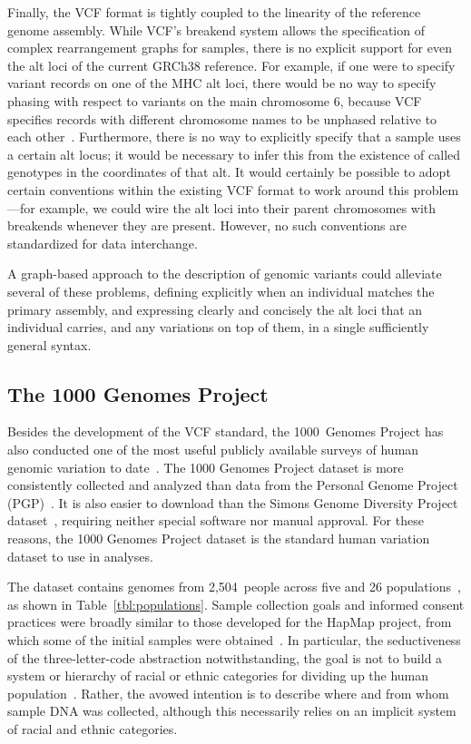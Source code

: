 Finally, the VCF format is tightly coupled to the linearity of the reference genome assembly. While VCF's breakend system allows the specification of complex rearrangement graphs for samples, there is no explicit support for even the alt loci of the current GRCh38 reference. For example, if one were to specify variant records on one of the MHC alt loci, there would be no way to specify phasing with respect to variants on the main chromosome 6, because VCF specifies records with different chromosome names to be unphased relative to each other~\cite{marshall2013variant}. Furthermore, there is no way to explicitly specify that a sample uses a certain alt locus; it would be necessary to infer this from the existence of called genotypes in the coordinates of that alt. It would certainly be possible to adopt certain conventions within the existing VCF format to work around this problem---for example, we could wire the alt loci into their parent chromosomes with breakends whenever they are present. However, no such conventions are standardized for data interchange.

A graph-based approach to the description of genomic variants could alleviate several of these problems, defining explicitly when an individual matches the primary assembly, and expressing clearly and concisely the alt loci that an individual carries, and any variations on top of them, in a single sufficiently general syntax.

\subsection{The 1000 Genomes Project}

Besides the development of the VCF standard, the 1000~Genomes Project has also conducted one of the most useful publicly available surveys of human genomic variation to date~\cite{10002015global}. The 1000 Genomes Project dataset is more consistently collected and analyzed than data from the Personal Genome Project (PGP)~\cite{church2005personal}. It is also easier to download than the Simons Genome Diversity Project dataset~\cite{simons2017simons}, requiring neither special software nor manual approval. For these reasons, the 1000 Genomes Project dataset is the standard human variation dataset to use in analyses.

The dataset contains genomes from 2,504~people across five  and 26 populations~\cite{10002015global}, as shown in Table~\ref{tbl:populations}. Sample collection goals and informed consent practices were broadly similar to those developed for the HapMap project, from which some of the initial samples were obtained~\cite{international2004integrating}. In particular, the seductiveness of the three-letter-code abstraction notwithstanding, the goal is not to build a system or hierarchy of racial or ethnic categories for dividing up the human population~\cite{international2004integrating}. Rather, the avowed intention is to describe where and from whom sample DNA was collected, although this necessarily relies on an implicit system of racial and ethnic categories.

